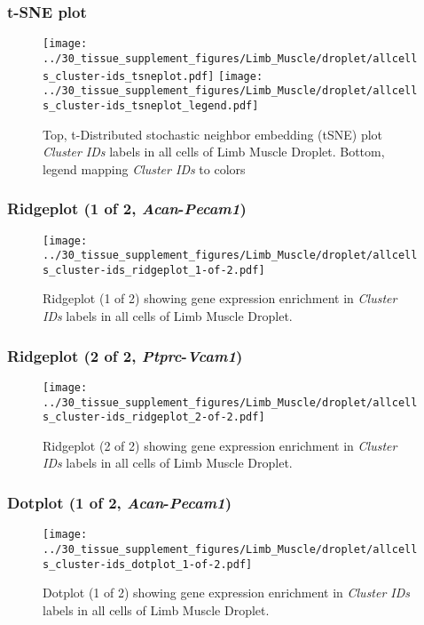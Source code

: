\clearpage
\subsubsection{t-SNE plot}
\begin{figure}[h]
\centering
\texttt{[image: ../30\_tissue\_supplement\_figures/Limb\_Muscle/droplet/allcells\_cluster-ids\_tsneplot.pdf]}
\texttt{[image: ../30\_tissue\_supplement\_figures/Limb\_Muscle/droplet/allcells\_cluster-ids\_tsneplot\_legend.pdf]}
\caption{Top, t-Distributed stochastic neighbor embedding (tSNE) plot  \emph{Cluster IDs} labels in all cells of Limb Muscle Droplet. Bottom, legend mapping \emph{Cluster IDs} to colors}
\end{figure}


\clearpage

\subsubsection{Ridgeplot (1 of 2, \emph{Acan}-\emph{Pecam1})}
\begin{figure}[h]
\centering
\texttt{[image: ../30\_tissue\_supplement\_figures/Limb\_Muscle/droplet/allcells\_cluster-ids\_ridgeplot\_1-of-2.pdf]}

\caption{ Ridgeplot (1 of 2)  showing gene expression enrichment in \emph{Cluster IDs} labels in all cells of Limb Muscle Droplet. }
\end{figure}


\clearpage

\subsubsection{Ridgeplot (2 of 2, \emph{Ptprc}-\emph{Vcam1})}
\begin{figure}[h]
\centering
\texttt{[image: ../30\_tissue\_supplement\_figures/Limb\_Muscle/droplet/allcells\_cluster-ids\_ridgeplot\_2-of-2.pdf]}

\caption{ Ridgeplot (2 of 2)  showing gene expression enrichment in \emph{Cluster IDs} labels in all cells of Limb Muscle Droplet. }
\end{figure}


\clearpage

\subsubsection{Dotplot (1 of 2, \emph{Acan}-\emph{Pecam1})}
\begin{figure}[h]
\centering
\texttt{[image: ../30\_tissue\_supplement\_figures/Limb\_Muscle/droplet/allcells\_cluster-ids\_dotplot\_1-of-2.pdf]}

\caption{ Dotplot (1 of 2)  showing gene expression enrichment in \emph{Cluster IDs} labels in all cells of Limb Muscle Droplet. }
\end{figure}


